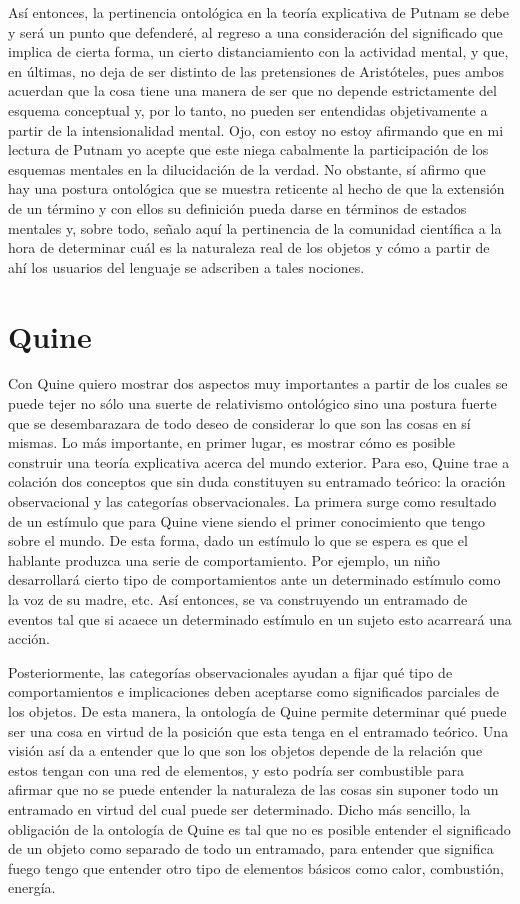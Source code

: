\documentclass[]{book}
\begin{document}
\begin{refsection}
Así entonces, la pertinencia ontológica en la teoría explicativa de
Putnam se debe y será un punto que defenderé, al regreso a una
consideración del significado que implica de cierta forma, un cierto
distanciamiento con la actividad mental, y que, en últimas, no deja de
ser distinto de las pretensiones de Aristóteles, pues ambos acuerdan que
la cosa tiene una manera de ser que no depende estrictamente del esquema
conceptual y, por lo tanto, no pueden ser entendidas objetivamente a
partir de la intensionalidad mental. Ojo, con estoy no estoy afirmando
que en mi lectura de Putnam yo acepte que este niega cabalmente la
participación de los esquemas mentales en la dilucidación de la verdad.
No obstante, sí afirmo que hay una postura ontológica que se muestra
reticente al hecho de que la extensión de un término y con ellos su
definición pueda darse en términos de estados mentales y, sobre todo,
señalo aquí la pertinencia de la comunidad científica a la hora de
determinar cuál es la naturaleza real de los objetos y cómo a partir de
ahí los usuarios del lenguaje se adscriben a tales nociones.

\section*{Quine}

Con Quine quiero mostrar dos aspectos muy importantes a partir de los
cuales se puede tejer no sólo una suerte de relativismo ontológico sino
una postura fuerte que se desembarazara de todo deseo de considerar lo
que son las cosas en sí mismas. Lo más importante, en primer lugar, es
mostrar cómo es posible construir una teoría explicativa acerca del
mundo exterior. Para eso, Quine trae a colación dos conceptos que sin
duda constituyen su entramado teórico: la oración observacional y las
categorías observacionales. La primera surge como resultado de un
estímulo que para Quine viene siendo el primer conocimiento que tengo
sobre el mundo. De esta forma, dado un estímulo lo que se espera es que
el hablante produzca una serie de comportamiento. Por ejemplo, un niño
desarrollará cierto tipo de comportamientos ante un determinado estímulo
como la voz de su madre, etc. Así entonces, se va construyendo un
entramado de eventos tal que si acaece un determinado estímulo en un
sujeto esto acarreará una acción.

Posteriormente, las categorías observacionales ayudan a fijar qué tipo
de comportamientos e implicaciones deben aceptarse como significados
parciales de los objetos. De esta manera, la ontología de Quine permite
determinar qué puede ser una cosa en virtud de la posición que esta
tenga en el entramado teórico. Una visión así da a entender que lo que
son los objetos depende de la relación que estos tengan con una red de
elementos, y esto podría ser combustible para afirmar que no se puede
entender la naturaleza de las cosas sin suponer todo un entramado en
virtud del cual puede ser determinado. Dicho más sencillo, la obligación
de la ontología de Quine es tal que no es posible entender el
significado de un objeto como separado de todo un entramado, para
entender que significa fuego tengo que entender otro tipo de elementos
básicos como calor, combustión, energía.


\end{refsection}
\end{document}
